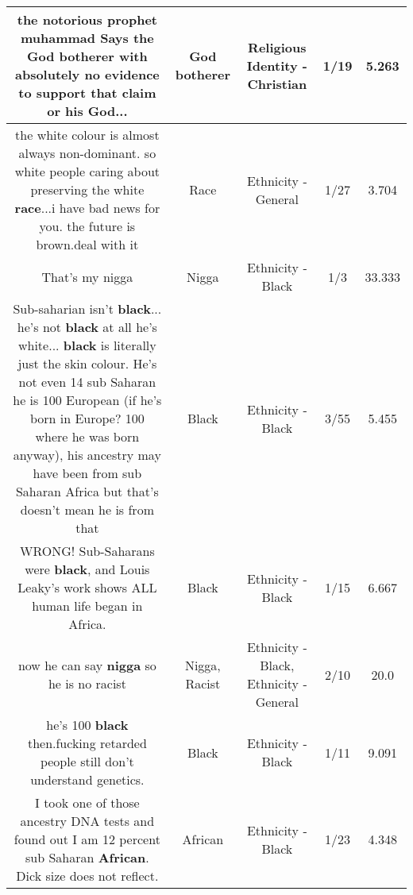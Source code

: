 \documentclass[11pt]{article}
\newlength\mylength
\begin{document}
\begin{center}
\begin{longtable}{|C{.65\mylength}|C{.30\mylength}|C{.12\mylength}|C{.12\mylength}|C{.12\mylength}|}
  \small the notorious prophet muhammad Says the \textbf{God botherer} with absolutely no evidence to support that claim or his God...\normalsize   & God botherer & Religious Identity - Christian & 1/19 & 5.263 \\  \hline
  \small the white colour is almost always non-dominant. so white people caring about preserving the white \textbf{race}...i have bad news for you. the future is brown.deal with it\normalsize   & Race & Ethnicity - General & 1/27 & 3.704 \\  \hline
  \small That's my nigga\normalsize   & Nigga & Ethnicity - Black & 1/3 & 33.333 \\  \hline
  \small Sub-saharian isn't \textbf{black}... he's not \textbf{black} at all he's white... \textbf{black} is literally just the skin colour. He's not even 14 sub Saharan he is 100 European (if he's born in Europe? 100 where he was born anyway), his ancestry may have been from sub Saharan Africa but that's doesn't mean he is from that\normalsize   & Black & Ethnicity - Black & 3/55 & 5.455 \\  \hline
  \small WRONG!  Sub-Saharans were \textbf{black}, and Louis Leaky's work shows ALL human life began in Africa.\normalsize   & Black & Ethnicity - Black & 1/15 & 6.667 \\  \hline
  \small now he can say \textbf{nigga} so he is no racist\normalsize   & Nigga, Racist & Ethnicity - Black, Ethnicity - General & 2/10 & 20.0 \\  \hline
  \small he's 100 \textbf{black} then.fucking retarded people still don't understand genetics.\normalsize   & Black & Ethnicity - Black & 1/11 & 9.091 \\  \hline
  \small I took one of those ancestry DNA tests and found out I am 12 percent sub Saharan \textbf{African}. Dick size does not reflect.\normalsize   & African & Ethnicity - Black & 1/23 & 4.348 \\  \hline

\end{longtable}
\end{center}
\end{document}
